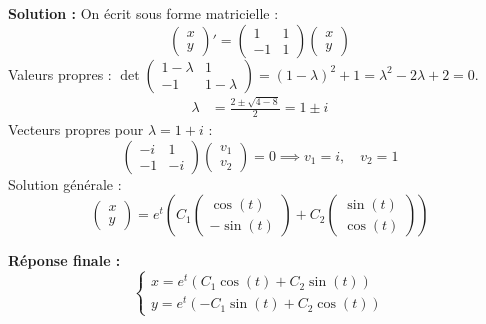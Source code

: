 \documentclass[11pt]{article}
\begin{document}
\textbf{Solution :}
On écrit sous forme matricielle :
\[
\begin{pmatrix} x \\ y \end{pmatrix}' = \begin{pmatrix} 1 & 1 \\ -1 & 1 \end{pmatrix} \begin{pmatrix} x \\ y \end{pmatrix}
\]
Valeurs propres : $\det \begin{pmatrix} 1 - \lambda & 1 \\ -1 & 1 - \lambda \end{pmatrix} = (1 - \lambda)^2 + 1 = \lambda^2 - 2\lambda + 2 = 0$.
\begin{align*}
    \lambda &= \frac{2 \pm \sqrt{4 - 8}}{2} = 1 \pm i
\end{align*}
Vecteurs propres pour $\lambda = 1 + i$ :
\[
\begin{pmatrix} -i & 1 \\ -1 & -i \end{pmatrix} \begin{pmatrix} v_1 \\ v_2 \end{pmatrix} = 0 \implies v_1 = i, \quad v_2 = 1
\]
Solution générale :
\[
\begin{pmatrix} x \\ y \end{pmatrix} = e^{t} \left( C_1 \begin{pmatrix} \cos(t) \\ -\sin(t) \end{pmatrix} + C_2 \begin{pmatrix} \sin(t) \\ \cos(t) \end{pmatrix} \right)
\]

\textbf{Réponse finale :}
\[
\boxed{\begin{cases}
    x = e^{t} (C_1 \cos(t) + C_2 \sin(t)) \\
    y = e^{t} (-C_1 \sin(t) + C_2 \cos(t))
\end{cases}}
\]
\end{document}
